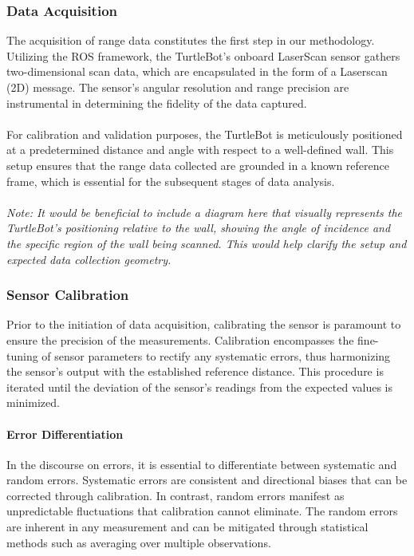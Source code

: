 \documentclass[12pt,a4paper]{article}
\begin{document}
	\subsubsection{Data Acquisition}
	The acquisition of range data constitutes the first step in our methodology. Utilizing the ROS framework, the TurtleBot's onboard LaserScan sensor gathers two-dimensional scan data, which are encapsulated in the form of a Laserscan (2D) message. The sensor's angular resolution and range precision are instrumental in determining the fidelity of the data captured.
	\\\\
	For calibration and validation purposes, the TurtleBot is meticulously positioned at a predetermined distance and angle with respect to a well-defined wall. This setup ensures that the range data collected are grounded in a known reference frame, which is essential for the subsequent stages of data analysis.
	\\\\
	\textit{Note: It would be beneficial to include a diagram here that visually represents the TurtleBot’s positioning relative to the wall, showing the angle of incidence and the specific region of the wall being scanned. This would help clarify the setup and expected data collection geometry.}
	
	\subsubsection{Sensor Calibration}
	Prior to the initiation of data acquisition, calibrating the sensor is paramount to ensure the precision of the measurements. Calibration encompasses the fine-tuning of sensor parameters to rectify any systematic errors, thus harmonizing the sensor's output with the established reference distance. This procedure is iterated until the deviation of the sensor's readings from the expected values is minimized.
	
	\paragraph{Error Differentiation}
	In the discourse on errors, it is essential to differentiate between systematic and random errors. Systematic errors are consistent and directional biases that can be corrected through calibration. In contrast, random errors manifest as unpredictable fluctuations that calibration cannot eliminate. The random errors are inherent in any measurement and can be mitigated through statistical methods such as averaging over multiple observations.
	
\end{document}
